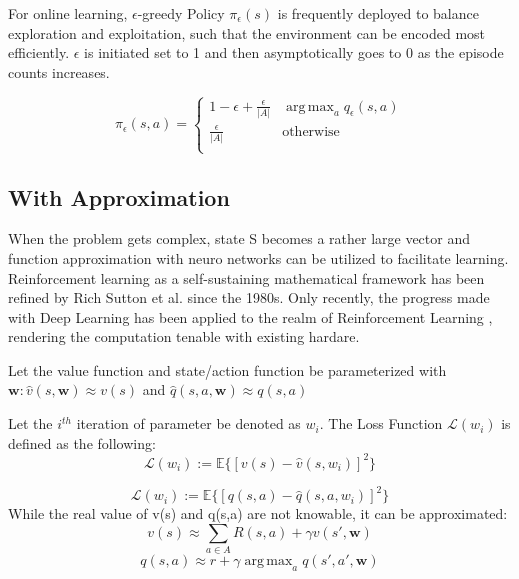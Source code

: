 \documentclass[journal]{IEEEtran}
\DeclareMathOperator*{\argmax}{arg\,max}  %
\begin{document}
For online learning, $\epsilon$-greedy Policy $\pi_{\epsilon}(s)$ is frequently deployed to balance exploration and exploitation, such that the environment can be encoded most efficiently. $\epsilon$ is initiated set to 1 and then asymptotically goes to 0 as the episode counts increases.

\begin{equation*}
    \pi_{\epsilon}(s,a) = \begin{cases}
        1-\epsilon+\frac{\epsilon}{|A|}& \displaystyle\argmax_{a} q_{\epsilon}(s,a)\\
        \frac{\epsilon}{|A|}& \text{otherwise}\\
           \end{cases}
\end{equation*}

\subsection{With Approximation}
When the problem gets complex, state S becomes a rather large vector and function approximation with neuro networks can be utilized to facilitate learning. Reinforcement learning as a self-sustaining mathematical framework has been refined by Rich Sutton et al. since the 1980s. Only recently, the progress made with Deep Learning has been applied to the realm of Reinforcement Learning \cite{Mnih2013PlayingAW}, rendering the computation tenable with existing hardare.

Let the value function and state/action function be parameterized with $\textbf{w}:  \hat{v}(s,\textbf{w}) \approx v(s)$ and $\hat{q}(s,a,\textbf{w}) \approx q(s,a) $

Let the $i^{th}$ iteration of parameter be denoted as $\textbf{$w_i$}$. The Loss Function $\mathcal{L}(\textbf{$w_i$})$ is defined as the following:
\begin{equation}
    \mathcal{L}(\textbf{$w_i$}) := \mathbb{E}\{[v(s)-\hat{v}(s,\textbf{$w_i$})]^2\}
    \label{v_loss}
\end{equation}

\begin{equation}
    \mathcal{L}(\textbf{$w_i$}) := \mathbb{E}\{[q(s,a)-\hat{q}(s,a,\textbf{$w_i$})]^2\}
    \label{q_loss}
\end{equation}
While the real value of v(s) and q(s,a) are not knowable, it can be approximated:
\begin{equation}
    v(s) \approx \sum_{a \in A} R(s,a)+\gamma v(s',\textbf{w})
    \label{v_approx}
\end{equation}
\begin{equation}
    q(s,a) \approx r+\gamma \argmax_{a} q(s',a',\textbf{w})
    \label{q_approx}
\end{equation}
\end{document}
